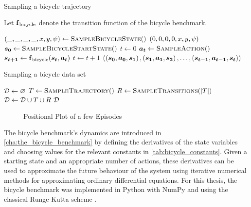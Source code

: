 \begin{algorithm}[tp]
    \caption{Sampling a bicycle trajectory}
    \label{alg:bicycle_trajectories}
    Let $\DynBicycle$ denote the transition function of the bicycle benchmark.
    \begin{algorithmic}[1]
            \State $\Bicycle*{\_, \_, \_, \_, x, y, \psi} \gets \Call{SampleBicycleState}$
            \State \Return $\Bicycle*{0, 0, 0, 0, x, y, \psi}$
        \EndFunction
        \Statex
            \State $\mat{s_0} \gets \Call{SampleBicycleStartState}$
            \State $t \gets 0$
                \State $\mat{a_t} \gets \Call{SampleAction}$
                \State $\mat{s_{t+1}} \gets \DynBicycle(\mat{s_t}, \mat{a_t})$
                \State $t \gets t + 1$
            \EndWhile
            \State \Return $\left( \left( \mat{s_0}, \mat{a_0}, \mat{s_1} \right), \left( \mat{s_1}, \mat{a_1}, \mat{s_2} \right), \dots, \left( \mat{s_{t-1}}, \mat{a_{t-1}}, \mat{s_t} \right) \right)$
        \EndFunction
    \end{algorithmic}
\end{algorithm}
\begin{algorithm}[tp]
    \caption{Sampling a bicycle data set}
    \label{alg:bicycle_data_set}
    \begin{algorithmic}[1]
            \State $\D \gets \emptyset$
                \State $T \gets \Call{SampleTrajectory}$
                \State $R \gets \Call{SampleTransitions}{\abs{T}}$
                \State $\D \gets \D \cup T \cup R$
            \EndWhile
            \State \Return $\D$
        \EndFunction
    \end{algorithmic}
\end{algorithm}
\begin{figure}[tp]
    \centering
    \caption{Positional Plot of a few Episodes}
    \label{fig:data_set_plot}
\end{figure}
The bicycle benchmark's dynamics are introduced in \cref{cha:the_bicycle_benchmark} by defining the derivatives of the state variables and choosing values for the relevant constants in \cref{tab:bicycle_constants}.
Given a starting state and an appropriate number of actions, these derivatives can be used to approximate the future behaviour of the system using iterative numerical methods for approximating ordinary differential equations.
For this thesis, the bicycle benchmark was implemented in Python \cite{rossum_python_1995} with NumPy \cite{walt_numpy_2011} and using the classical Runge-Kutta scheme \cite{kutta_beitrag_1901}.


